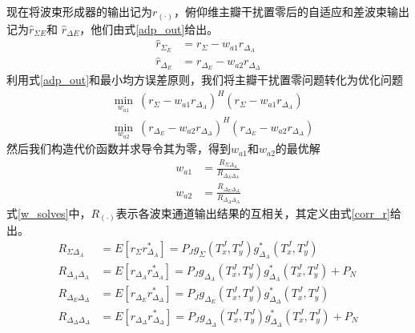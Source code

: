 \documentclass[master]{thesis-uestc}
\begin{document}
现在将波束形成器的输出记为$r_{(\cdot)}$，俯仰维主瓣干扰置零后的自适应和差波束输出记为$\hat{r}_{\Sigma E}$和
$\hat{r}_{\Delta E}$，他们由式\eqref{adp_out}给出。
\begin{subequations}\label{adp_out}
    \begin{align}
        \hat{r}_{\Sigma_{E}}&=r_{\Sigma}-w_{a 1} r_{\Delta_{A}} \\
        \hat{r}_{\Delta_{E}}&=r_{\Delta_{E}}-w_{a 2} r_{\Delta_{\Delta}}
    \end{align}
\end{subequations}
利用式\eqref{adp_out}和最小均方误差原则，我们将主瓣干扰置零问题转化为优化问题
\begin{subequations}
    \begin{align}
        &\min_{w_{a1}} ~ \left(r_{\Sigma}-w_{a 1} r_{\Delta_{A}}\right)^H
                         \left(r_{\Sigma}-w_{a 1} r_{\Delta_{A}}\right)
        \\
        &\min_{w_{a2}} ~ \left(r_{\Delta_{E}}-w_{a 2} r_{\Delta_{\Delta}}\right)^H
                         \left(r_{\Delta_{E}}-w_{a 2} r_{\Delta_{\Delta}}\right)
    \end{align}
\end{subequations}
然后我们构造代价函数并求导令其为零，得到$w_{a1}$和$w_{a2}$的最优解
\begin{subequations}\label{w_solves}
    \begin{align}
        w_{a 1}&=\frac{R_{\Sigma \Delta_{A}}}{R_{\Delta_{A} \Delta_{A}}} \\
        w_{a 2}&=\frac{R_{\Delta_{E} \Delta_{\Delta}}}{R_{\Delta_{\Delta} \Delta_{\Delta}}}
    \end{align}
\end{subequations}
式\eqref{w_solves}中，$R_{(\cdot)}$表示各波束通道输出结果的互相关，其定义由式\eqref{corr_r}给出。
\begin{subequations}\label{corr_r}
    \begin{align}
        R_{\Sigma \Delta_{A}} &=E\left[r_{\Sigma} r_{\Delta_{A}}^{*}\right]
                               =P_{J} g_{\Sigma}\left(T_{x}^{J}, T_{y}^{J}\right) 
                                g_{\Delta_{A}}^{*}\left(T_{x}^{J}, T_{y}^{J}\right) \\
        R_{\Delta_{A} \Delta_{A}} &=E\left[r_{\Delta_{A}} r_{\Delta_{A}}^{*}\right]
                                   =P_{J} g_{\Delta_{A}}\left(T_{x}^{J}, T_{y}^{J}\right) 
                                    g_{\Delta_{A}}^{*}\left(T_{x}^{J}, T_{y}^{J}\right)+P_N \\
        R_{\Delta_{E} \Delta_{\Delta}} &=E\left[r_{\Delta_{E}} r_{\Delta_{\Delta}}^{*}\right]
                                        =P_{J} g_{\Delta_{E}}\left(T_{x}^{J}, T_{y}^{J}\right) 
                                         g_{\Delta_{\Delta}}^{*}\left(T_{x}^{J}, T_{y}^{J}\right) \\
        R_{\Delta_{\Delta} \Delta_{\Delta}} &=E\left[r_{\Delta_{\Delta}} r_{\Delta_{\Delta}}^{*}\right]
                                             =P_{J} g_{\Delta_{\Delta}}\left(T_{x}^{J}, T_{y}^{J}\right) 
                                             g_{\Delta_{\Delta}}^{*}\left(T_{x}^{J}, T_{y}^{J}\right)+P_N
    \end{align}
\end{subequations}
\end{document}
